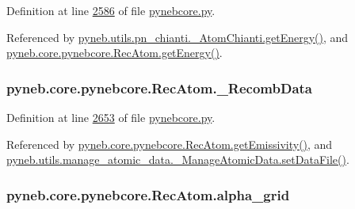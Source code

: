 Definition at line \hyperlink{pynebcore_8py_source_l02586}{2586} of file \hyperlink{pynebcore_8py_source}{pynebcore.\+py}.



Referenced by \hyperlink{pn__chianti_8py_source_l00346}{pyneb.\+utils.\+pn\+\_\+chianti.\+\_\+\+Atom\+Chianti.\+get\+Energy()}, and \hyperlink{pynebcore_8py_source_l02811}{pyneb.\+core.\+pynebcore.\+Rec\+Atom.\+get\+Energy()}.

\hypertarget{classpyneb_1_1core_1_1pynebcore_1_1_rec_atom_a1f483d9d99af479ef137489ccefe35e9}{}
\subsubsection[{\+\_\+\+Recomb\+Data}]{\setlength{\rightskip}{0pt plus 5cm}pyneb.\+core.\+pynebcore.\+Rec\+Atom.\+\_\+\+Recomb\+Data\hspace{0.3cm}{\ttfamily [private]}}\label{classpyneb_1_1core_1_1pynebcore_1_1_rec_atom_a1f483d9d99af479ef137489ccefe35e9}


Definition at line \hyperlink{pynebcore_8py_source_l02653}{2653} of file \hyperlink{pynebcore_8py_source}{pynebcore.\+py}.



Referenced by \hyperlink{pynebcore_8py_source_l02873}{pyneb.\+core.\+pynebcore.\+Rec\+Atom.\+get\+Emissivity()}, and \hyperlink{manage__atomic__data_8py_source_l00380}{pyneb.\+utils.\+manage\+\_\+atomic\+\_\+data.\+\_\+\+Manage\+Atomic\+Data.\+set\+Data\+File()}.

\hypertarget{classpyneb_1_1core_1_1pynebcore_1_1_rec_atom_ad253222149ed56462daddaa2b9287cbb}{}
\subsubsection[{alpha\+\_\+grid}]{\setlength{\rightskip}{0pt plus 5cm}pyneb.\+core.\+pynebcore.\+Rec\+Atom.\+alpha\+\_\+grid}\label{classpyneb_1_1core_1_1pynebcore_1_1_rec_atom_ad253222149ed56462daddaa2b9287cbb}



